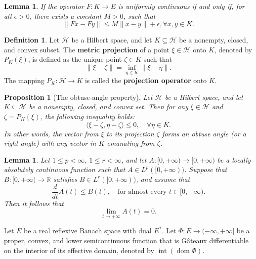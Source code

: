 \documentclass[hidelinks,11 pt]{article}
\numberwithin{equation}{section}
\newtheorem{lemma}[theorem]{Lemma}
\newtheorem{proposition}[theorem]{Proposition}
\theoremstyle{definition}  %
\newtheorem{definition}[theorem]{Definition}
\numberwithin{equation}{section}
\numberwithin{theorem}{section}
\begin{document}
\begin{lemma}\cite{a27}\label{l2.2}
    If the operator $F:K\to E$ is uniformly continuous if and only if,  for all $\epsilon>0$, there exists a constant $M>0$, such that 
    \begin{equation*}
        \|Fx-Fy\|\leq M\|x-y\|+\epsilon, \forall x,y\in K.
    \end{equation*}
\end{lemma}

\begin{definition}
Let \( \mathcal{H} \) be a Hilbert space, and let \( K \subseteq \mathcal{H} \) be a nonempty, closed, and convex subset. The \textbf{metric projection} of a point \( \xi \in \mathcal{H} \) onto \( K \), denoted by \( P_K(\xi) \), is defined as the unique point \( \zeta \in K \) such that
\[
\|\xi - \zeta\| = \inf_{\eta \in K} \|\xi - \eta\|.
\]
The mapping \( P_K : \mathcal{H} \to K \) is called the \textbf{projection operator} onto \( K \).
\end{definition}

\begin{proposition}[The obtuse-angle property]
Let \( \mathcal{H} \) be a Hilbert space, and let \( K \subseteq \mathcal{H} \) be a nonempty, closed, and convex set. Then for any \( \xi \in \mathcal{H} \) and \( \zeta = P_K(\xi) \), the following inequality holds:
\[
\langle \xi - \zeta, \eta - \zeta \rangle \leq 0, \quad \forall \eta \in K.
\]
In other words, the vector from \( \xi \) to its projection \( \zeta \) forms an obtuse angle (or a right angle) with any vector in \( K \) emanating from \( \zeta \).
\end{proposition}
\begin{lemma}\cite{a28}
\label{lemma:asymptotic_decay}
Let \(1 \leq p < \infty\), \(1 \leq r < \infty\), and let \(A : [0, +\infty) \to [0, +\infty)\) be a locally absolutely continuous function such that \(A \in L^p([0, +\infty))\). Suppose that \(B : [0, +\infty) \to \mathbb{R}\) satisfies \(B \in L^r([0, +\infty))\), and assume that
\[
\frac{d}{dt} A(t) \leq B(t), \quad \text{for almost every } t \in [0, +\infty).
\]
Then it follows that
\[
\lim_{t \to +\infty} A(t) = 0.
\]
\end{lemma}
\vskip 2mm 
Let \( E \) be a real reflexive Banach space with dual \( E^* \). Let \( \Phi: E \to (-\infty, +\infty] \) be a proper, convex, and lower semicontinuous function that is Gâteaux differentiable on the interior of its effective domain, denoted by \( \operatorname{int}(\operatorname{dom} \Phi) \).
\end{document}
